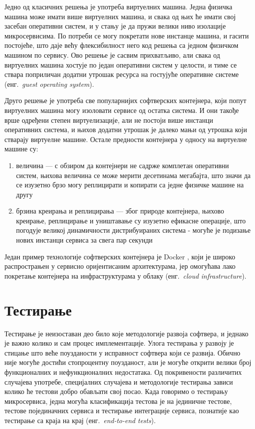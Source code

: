 \documentclass[12pt,oneside]{memoir}
\begin{document}
Једно од класичних решења је употреба виртуелних машина. Једна физичка машина може имати више виртуелних машина, и свака од њих ће имати свој засебан оперативни систем, и у стању је да пружи велики ниво изолације микросервисима. По потреби се могу покретати нове инстанце машина, и гасити постојеће, што даје већу флексибилност него код решења са једном физичком машином по сервису. Ово решење је сасвим прихватљиво, али свака од виртуелних машина хостује по један оперативни систем у целости, и тиме се ствара поприличан додатни утрошак ресурса на гостујуће оперативне системе (енг.~\textit{guest operating system}).

Друго решење је употреба све популарнијих софтверских контејнера, који попут виртуелних машина могу изоловати сервисе од остатка система. И они такође врше одређени степен виртуелизације, али не постоји више инстанци оперативних система, и њихов додатни утрошак је далеко мањи од утрошка који стварају виртуелне машине. Остале предности контејнера у односу на виртуелне машине су:
\begin{enumerate}
\item величина --- с обзиром да контејнери не садрже комплетан оперативни систем, њихова величина се може мерити десетинама мегабајта, што значи да се изузетно брзо могу реплицирати и копирати са једне физичке машине на другу
\item брзина креирања и реплицирања --- због природе контејнера, њихово креирање, реплицирање и уништавање су изузетно ефикасне операције, што погодује великој динамичности дистрибуираних система - могуће је подизање нових инстанци сервиса за свега пар секунди
\end{enumerate}
Један пример технологије софтверских контејнера је Docker \cite{Docker}, који је широко распрострањен у сервисно оријентисаним архитектурама, јер омогућава лако покретање контејнера на инфраструктурама у облаку (енг.~\textit{cloud infrastructure}).

\section{Тестирање}
Тестирање је неизоставан део било које методологије развоја софтвера, и једнако је важно колико и сам процес имплементације. Улога тестирања у развоју је стицање што веће поузданости у исправност софтвера који се развија. Обично није могуће достићи стопроцентну поузданост, али је могуће открити велики број функционалних и нефункционалних недостатака. Од покривености различитих случајева употребе, специјалних случајева и методологије тестирања зависи колико ће тестови добро обављати свој посао. Када говоримо о тестирању микросервиса, једна могућа класификација тестова је на јединичне тестове, тестове појединачних сервиса и тестирање интеграције сервиса, познатије као тестирање са краја на крај (енг.~\textit{end-to-end tests}).
\end{document}
